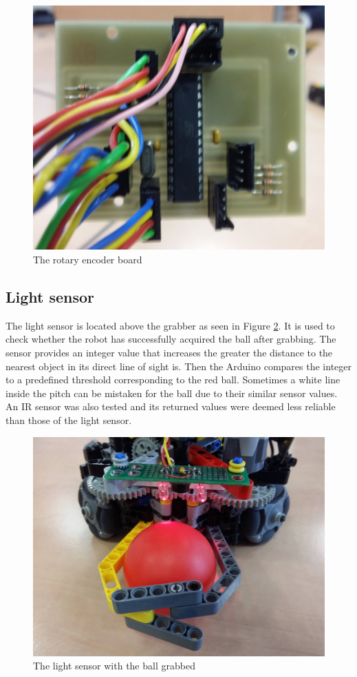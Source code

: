 \documentclass[a4paper,12pt]{article}
\begin{document}
\begin{figure}[ht!]
\centering
\includegraphics[scale=.1]{rotary1}
\caption{The rotary encoder board}
\label{fig:rotary}
\end{figure}

\subsection{Light sensor}

The light sensor is located above the grabber as seen in Figure \ref{fig:sensor}. It is used to check whether
the robot has successfully acquired the ball after grabbing. The sensor
provides an integer value that increases the greater the distance to the
nearest object in its direct line of sight is. Then the Arduino compares the integer
to a predefined threshold corresponding to the red ball. Sometimes a white
line inside the pitch can be mistaken for the ball due to their similar sensor
values. An IR sensor was also tested and its returned values were deemed less reliable than
those of the light sensor.

\begin{figure}[ht!]
\centering
\includegraphics[scale=.1]{sensor1}
\caption{The light sensor with the ball grabbed}
\label{fig:sensor}
\end{figure}
\end{document}
